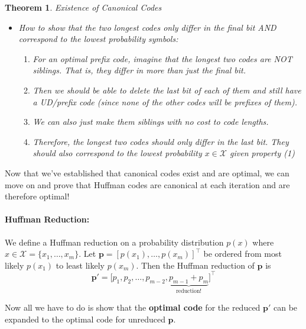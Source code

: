 \documentclass[a4paper,12pt]{report}
\newtheorem{theorem}{Theorem}
\begin{document}
\begin{theorem}{Existence of Canonical Codes}
\begin{itemize}
\item How to show that the two longest codes only differ in the final bit AND
correspond to the lowest probability symbols: 
	\begin{enumerate}
	\item For an optimal prefix code, imagine that the longest two codes are NOT
	siblings. That is, they differ in more than just the final bit. 
	\item Then we should be able to delete the last bit of each of them and
	still have a UD/prefix code (since none of the other codes will be prefixes
	of them). 
	\item We can also just make them siblings with no cost to code lengths.
	\item Therefore, the longest two codes should only differ in the last bit.
	They should also correspond to the lowest probability $x\in \mathcal X$
	given property (1) \qedsymbol{}
	\end{enumerate}
\end{itemize}
\end{theorem}


Now that we've established that canonical codes exist and are optimal, we can
move on and prove that Huffman codes are canonical at each iteration and are
therefore optimal!

\paragraph{Huffman Reduction: } We define a Huffman reduction on a probability
distribution $p(x)$ where $x\in \mathcal X = \{x_1, \dots, x_m\}$. Let $\mathbf
p = [p(x_1), \dots, p(x_m)]^\top$ be ordered from most likely $p(x_1)$ to least
likely $p(x_m)$. Then the Huffman reduction of $\mathbf p$ is 
\begin{equation}
	\mathbf p' = \big[ p_1, p_2, \dots, p_{m-2}, \underbrace{p_{m-1} +
	p_m}_{\text{reduction!}} \big]^\top
\end{equation}

Now all we have to do is show that the \textbf{optimal code} for the reduced
$\mathbf p'$ can be expanded to the optimal code for unreduced $\mathbf p$.
\end{document}
